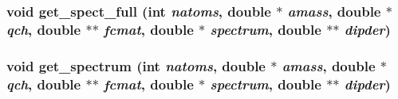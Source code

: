 \subsubsection{\setlength{\rightskip}{0pt plus 5cm}void get\_\-spect\_\-full (int {\em natoms}, double $\ast$ {\em amass}, double $\ast$ {\em qch}, double $\ast$$\ast$ {\em fcmat}, double $\ast$ {\em spectrum}, double $\ast$$\ast$ {\em dipder})}\label{md__spectrum_8c_30a596f3b6e5cbb2e1dd945cd82c662f}


\subsubsection{\setlength{\rightskip}{0pt plus 5cm}void get\_\-spectrum (int {\em natoms}, double $\ast$ {\em amass}, double $\ast$ {\em qch}, double $\ast$$\ast$ {\em fcmat}, double $\ast$ {\em spectrum}, double $\ast$$\ast$ {\em dipder})}\label{md__spectrum_8c_0608bff3fc635487bdce4e25774da35a}


